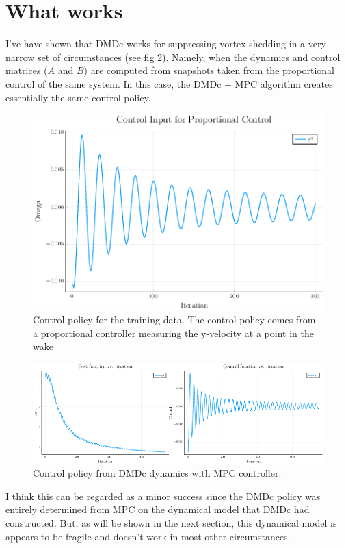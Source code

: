\documentclass{article}
\begin{document}
\section*{What works}
I've have shown that DMDc works for suppressing vortex shedding in a very narrow set of circumstances (see fig \ref{fig:dmdc_working}). Namely, when the dynamics and control matrices ($A$ and $B$) are computed from snapshots taken from the proportional control of the same system. In this case, the DMDc + MPC algorithm creates essentially the same control policy.


\begin{figure}
  \centering
  \includegraphics[scale=0.5]{../images/training_data.png}
  \caption{Control policy for the training data. The control policy comes from a proportional controller measuring the y-velocity at a point in the wake}
  \label{fig:training_data}
\end{figure}

\begin{figure}
  \centering
  \includegraphics[scale=0.5]{../images/dmdc_working.png}
  \caption{Control policy from DMDc dynamics with MPC controller.}
  \label{fig:dmdc_working}
\end{figure}


I think this can be regarded as a minor success since the DMDc policy was entirely determined from MPC on the dynamical model that DMDc had constructed. But, as will be shown in the next section, this dynamical model is appears to be fragile and doesn't work in most other circumstances.
\end{document}
